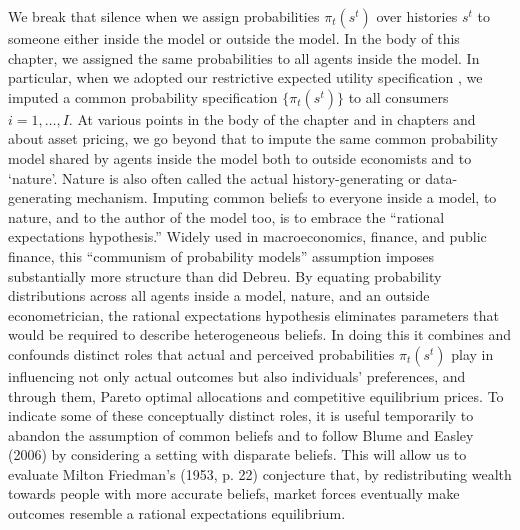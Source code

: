 %
We break that silence %
when we assign  probabilities $\pi_t(s^t)$ over histories $s^t$ to someone either inside the model or outside the model.
In the body of this chapter, we  assigned the same probabilities to all agents inside the model.  In particular, when we  adopted our restrictive expected utility specification , we
 imputed a common probability specification $\{\pi_t(s^t)\}$   to all consumers $i=1, \ldots, I$.
 At various points in the body of the  chapter and  in  chapters  and  about asset pricing,
 we   go beyond that to impute the same common probability model shared by agents inside the model  both to outside economists and to   `nature'. Nature is
 also often called  the
actual history-generating or data-generating mechanism.  Imputing common beliefs to everyone inside a model, to nature,
and to the author of the model too, is to embrace the  ``rational expectations hypothesis.''
%
%
Widely used in macroeconomics, finance, and public finance, this ``communism of probability models'' assumption imposes substantially more structure than did Debreu.
By equating probability distributions
 across all agents inside a model,  nature, and  an outside econometrician, the rational expectations hypothesis eliminates parameters that would
 be required to describe heterogeneous beliefs. In doing this it combines and confounds   distinct roles that actual and  perceived probabilities  $\pi_t(s^t)$ play in influencing not only actual outcomes but also   individuals'
preferences, and through them, Pareto optimal allocations and competitive equilibrium prices.
To indicate some of these conceptually distinct roles, it is useful temporarily to abandon the assumption of common beliefs and to follow
Blume and Easley (2006) by considering
a setting with disparate beliefs.  This will  allow us to evaluate  Milton Friedman's (1953, p. 22) conjecture
that, by redistributing wealth towards people with more accurate beliefs, market forces eventually make outcomes resemble
 a rational expectations equilibrium. %


